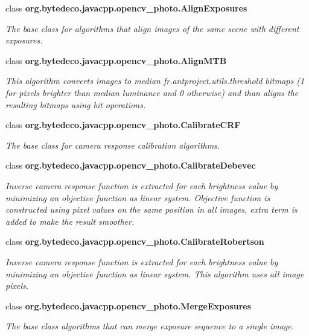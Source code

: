\begin{DoxyCompactItemize}
class {\bfseries org.\+bytedeco.\+javacpp.\+opencv\+\_\+photo.\+Align\+Exposures}
\begin{DoxyCompactList}\small\item\em The base class for algorithms that align images of the same scene with different exposures. \end{DoxyCompactList}\item 
class {\bfseries org.\+bytedeco.\+javacpp.\+opencv\+\_\+photo.\+Align\+M\+TB}
\begin{DoxyCompactList}\small\item\em This algorithm converts images to median fr.antproject.utils.threshold bitmaps (1 for pixels brighter than median luminance and 0 otherwise) and than aligns the resulting bitmaps using bit operations. \end{DoxyCompactList}\item
class {\bfseries org.\+bytedeco.\+javacpp.\+opencv\+\_\+photo.\+Calibrate\+C\+RF}
\begin{DoxyCompactList}\small\item\em The base class for camera response calibration algorithms. \end{DoxyCompactList}\item 
class {\bfseries org.\+bytedeco.\+javacpp.\+opencv\+\_\+photo.\+Calibrate\+Debevec}
\begin{DoxyCompactList}\small\item\em Inverse camera response function is extracted for each brightness value by minimizing an objective function as linear system. Objective function is constructed using pixel values on the same position in all images, extra term is added to make the result smoother. \end{DoxyCompactList}\item 
class {\bfseries org.\+bytedeco.\+javacpp.\+opencv\+\_\+photo.\+Calibrate\+Robertson}
\begin{DoxyCompactList}\small\item\em Inverse camera response function is extracted for each brightness value by minimizing an objective function as linear system. This algorithm uses all image pixels. \end{DoxyCompactList}\item 
class {\bfseries org.\+bytedeco.\+javacpp.\+opencv\+\_\+photo.\+Merge\+Exposures}
\begin{DoxyCompactList}\small\item\em The base class algorithms that can merge exposure sequence to a single image. \end{DoxyCompactList}\item 

\end{DoxyCompactItemize}
